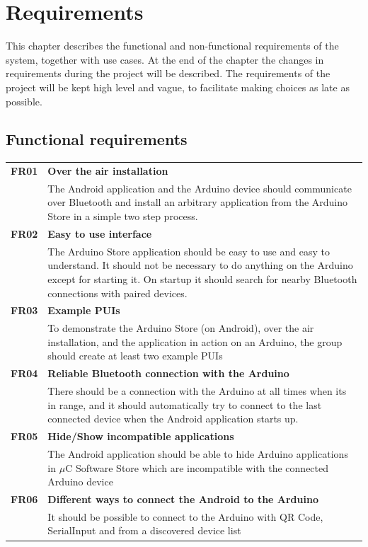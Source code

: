 \chapter{Requirements}
This chapter describes the functional and non-functional requirements of the system, together with use cases. At the end of the chapter the changes in requirements during the project will be described.
The requirements of the project will be kept high level and vague, to facilitate making choices as late as possible.

\section{Functional requirements}
	\begin{table}[H]
	\begin{tabularx}{\linewidth}{lX}

		\textbf{FR01} & \textbf{Over the air installation}\\
 		              & The Android application and the Arduino device should communicate over 
                        Bluetooth  and install an arbitrary application from the Arduino Store in a simple two step process.\\

		\textbf{FR02} & \textbf{Easy to use interface}\\
                      & The Arduino Store application should be easy to use and easy to understand. It should not be necessary to do anything on the Arduino except for starting it. On startup it should search for nearby Bluetooth  connections with paired devices.\\

 		\textbf{FR03} & \textbf{Example PUIs}\\
                      & To demonstrate the Arduino Store (on Android), over the air installation, and the application in action on an Arduino, the group should create at least two example PUIs \\

		\textbf{FR04} & \textbf{Reliable Bluetooth connection with the Arduino}\\
                      & There should be a connection with the Arduino at all times when its in range, and it should automatically try to connect to the last connected device when the Android application starts up.\\

        \textbf{FR05} & \textbf{Hide/Show incompatible applications}\\
                      & The Android application should be able to hide Arduino applications in $\mu$C Software Store which are incompatible with the connected Arduino device\\

        \textbf{FR06} & \textbf{Different ways to connect the Android to the Arduino}\\
                      & It should be possible to connect to the Arduino with QR Code, SerialInput and from a discovered device list\\

	\end{tabularx}
	\end{table}

